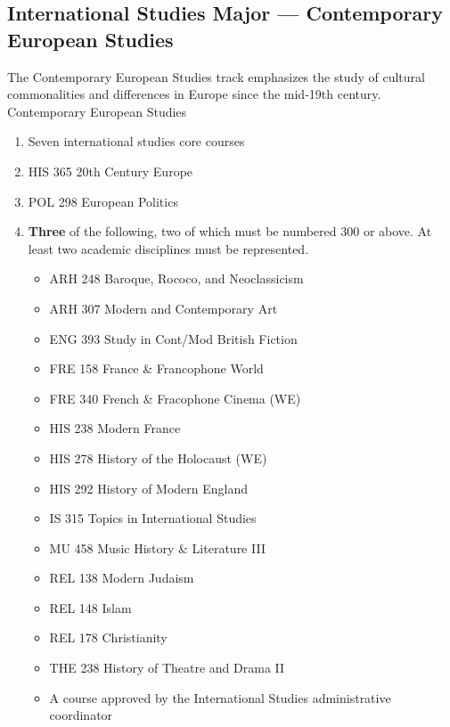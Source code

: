 \documentclass[
  letterpaper,
]{scrbook}
\providecommand{\tightlist}{%
  \setlength{\itemsep}{0pt}\setlength{\parskip}{0pt}}
\begin{document}
\subsection{International Studies Major --- Contemporary European
Studies}\label{international-studies-major-contemporary-european-studies}

The Contemporary European Studies track emphasizes the study of cultural
commonalities and differences in Europe since the mid-19th century.
Contemporary European Studies

\begin{enumerate}
\def\labelenumi{\arabic{enumi}.}
\tightlist
\item
  Seven international studies core courses
\item
  HIS 365 20th Century Europe
\item
  POL 298 European Politics
\item
  \textbf{Three} of the following, two of which must be numbered 300 or
  above. At least two academic disciplines must be represented.

  \begin{itemize}
  \tightlist
  \item
    ARH 248 Baroque, Rococo, and Neoclassicism
  \item
    ARH 307 Modern and Contemporary Art
  \item
    ENG 393 Study in Cont/Mod British Fiction
  \item
    FRE 158 France \& Francophone World
  \item
    FRE 340 French \& Fracophone Cinema (WE)
  \item
    HIS 238 Modern France
  \item
    HIS 278 History of the Holocaust (WE)
  \item
    HIS 292 History of Modern England
  \item
    IS 315 Topics in International Studies
  \item
    MU 458 Music History \& Literature III
  \item
    REL 138 Modern Judaism
  \item
    REL 148 Islam
  \item
    REL 178 Christianity
  \item
    THE 238 History of Theatre and Drama II
  \item
    A course approved by the International Studies administrative
    coordinator
  \end{itemize}
\end{enumerate}
\end{document}
